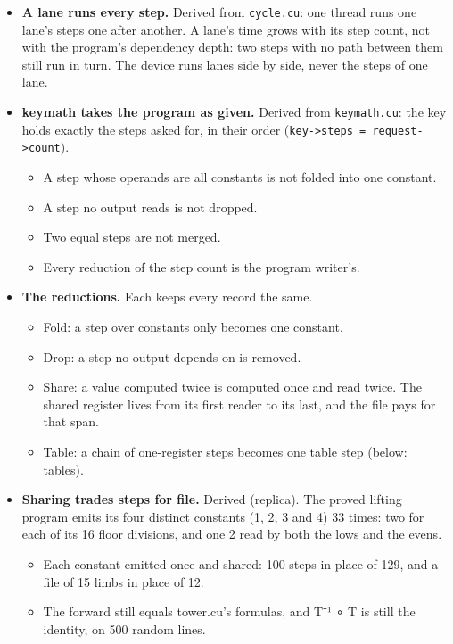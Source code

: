 \begin{itemize}
\item \textbf{A lane runs every step.} Derived from \texttt{cycle.\allowbreak{}cu}: one thread runs one lane's steps one after another. A lane's time grows with its step count, not with the program's dependency depth: two steps with no path between them still run in turn. The device runs lanes side by side, never the steps of one lane.
\item \textbf{keymath takes the program as given.} Derived from \texttt{keymath.\allowbreak{}cu}: the key holds exactly the steps asked for, in their order (\texttt{key-\allowbreak{}>steps = request-\allowbreak{}>count}).

\begin{itemize}
\item A step whose operands are all constants is not folded into one constant.
\item A step no output reads is not dropped.
\item Two equal steps are not merged.
\item Every reduction of the step count is the program writer's.
\end{itemize}
\item \textbf{The reductions.} Each keeps every record the same.

\begin{itemize}
\item Fold: a step over constants only becomes one constant.
\item Drop: a step no output depends on is removed.
\item Share: a value computed twice is computed once and read twice. The shared register lives from its first reader to its last, and the file pays for that span.
\item Table: a chain of one-register steps becomes one table step (below: tables).
\end{itemize}
\item \textbf{Sharing trades steps for file.} Derived (replica). The proved lifting program emits its four distinct constants (1, 2, 3 and 4) 33 times: two for each of its 16 floor divisions, and one 2 read by both the lows and the evens.

\begin{itemize}
\item Each constant emitted once and shared: 100 steps in place of 129, and a file of 15 limbs in place of 12.
\item The forward still equals tower.cu's formulas, and T⁻¹ ∘ T is still the identity, on 500 random lines.
\end{itemize}
\end{itemize}

